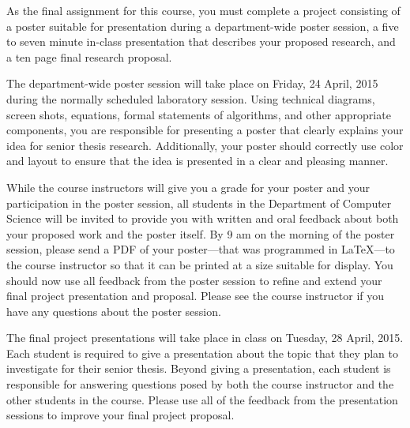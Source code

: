 
\usepackage{ulem}
\usepackage[compact]{titlesec}




As the final assignment for this course, you must complete a project consisting of a poster suitable for presentation
during a department-wide poster session, a five to seven minute in-class presentation that describes your proposed
research, and a ten page final research proposal.

The department-wide poster session will take place on Friday, 24 April, 2015 during the normally scheduled laboratory
session.  Using technical diagrams, screen shots, equations, formal statements of algorithms, and other appropriate
components,  you are responsible for presenting a poster that clearly explains your idea for senior thesis research.
Additionally, your poster should correctly use color and layout to ensure that the idea is presented in a clear and
pleasing manner.

While the course instructors will give you a grade for your poster and your participation in the poster session, all
students in the Department of Computer Science will be invited to provide you with written and oral feedback about both
your proposed work and the poster itself.  By 9 am on the morning of the poster session, please send a PDF of your
poster---that was programmed in \LaTeX---to the course instructor so that it can be printed at a size
suitable for display.  You should now use all feedback from the poster session to refine and extend your final project
presentation and proposal. Please see the course instructor if you have any questions about the poster session.

The final project presentations will take place in class on Tuesday, 28 April, 2015. Each student is required to give a
presentation about the topic that they plan to investigate for their senior thesis.  Beyond giving a presentation, each
student is responsible for answering questions posed by both the course instructor and the other students in the course.
Please use all of the feedback from the presentation sessions to improve your final project proposal.

